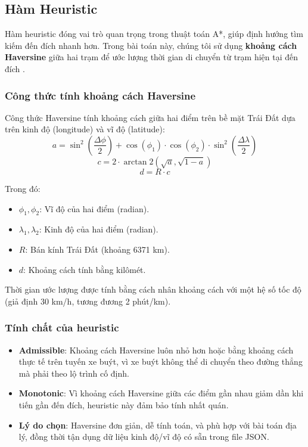 \documentclass[a4paper,12pt]{article}
\begin{document}
\subsection{Hàm Heuristic}
Hàm heuristic đóng vai trò quan trọng trong thuật toán A*, giúp định hướng tìm kiếm đến đích nhanh hơn. Trong bài toán này, chúng tôi sử dụng \textbf{khoảng cách Haversine} giữa hai trạm để ước lượng thời gian di chuyển từ trạm hiện tại đến đích \cite{hart1968} \cite{elmihoub2006}.

\subsubsection{Công thức tính khoảng cách Haversine}
Công thức Haversine tính khoảng cách giữa hai điểm trên bề mặt Trái Đất dựa trên kinh độ (longitude) và vĩ độ (latitude):
\[
a = \sin^2\left(\frac{\Delta \phi}{2}\right) + \cos(\phi_1) \cdot \cos(\phi_2) \cdot \sin^2\left(\frac{\Delta \lambda}{2}\right)
\]
\[
c = 2 \cdot \arctan2\left(\sqrt{a}, \sqrt{1-a}\right)
\]
\[
d = R \cdot c
\]

Trong đó:
\begin{itemize}
    \item $\phi_1, \phi_2$: Vĩ độ của hai điểm (radian).
    \item $\lambda_1, \lambda_2$: Kinh độ của hai điểm (radian).
    \item $R$: Bán kính Trái Đất (khoảng 6371 km).
    \item $d$: Khoảng cách tính bằng kilômét.
\end{itemize}
Thời gian ước lượng được tính bằng cách nhân khoảng cách  với một hệ số tốc độ (giả định 30 km/h, tương đương 2 phút/km).

\subsubsection{Tính chất của heuristic}

\begin{itemize}
    \item \textbf{Admissible}: Khoảng cách Haversine luôn nhỏ hơn hoặc bằng khoảng cách thực tế trên tuyến xe buýt, vì xe buýt không thể di chuyển theo đường thẳng mà phải theo lộ trình cố định.
    \item \textbf{Monotonic}: Vì khoảng cách Haversine giữa các điểm gần nhau giảm dần khi tiến gần đến đích, heuristic này đảm bảo tính nhất quán.
    \item \textbf{Lý do chọn}: Haversine đơn giản, dễ tính toán, và phù hợp với bài toán địa lý, đồng thời tận dụng dữ liệu kinh độ/vĩ độ có sẵn trong file JSON.
\end{itemize}
\end{document}
